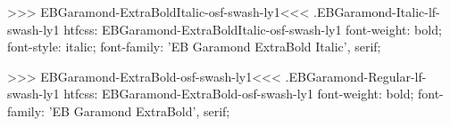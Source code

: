 {{>>>
\<EBGaramond-ExtraBoldItalic-osf-swash-ly1\><<<
.EBGaramond-Italic-lf-swash-ly1
htfcss:  EBGaramond-ExtraBoldItalic-osf-swash-ly1  font-weight: bold; font-style: italic; font-family: 'EB Garamond ExtraBold Italic', serif;

>>>
\<EBGaramond-ExtraBold-osf-swash-ly1\><<<
.EBGaramond-Regular-lf-swash-ly1
htfcss:  EBGaramond-ExtraBold-osf-swash-ly1  font-weight: bold; font-family: 'EB Garamond ExtraBold', serif;

}}
